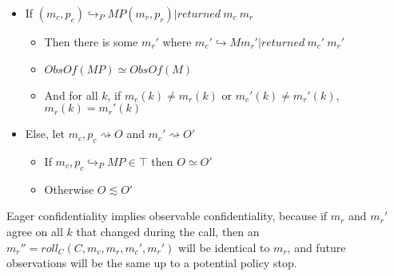 \documentclass{article}
\begin{document}
      \begin{itemize}
        \item If \((m_c,p_c) \hookrightarrow_P MP (m_r,p_r) | \mathit{returned}\ m_c\ m_r\)
          \begin{itemize}
            \item Then there is some \(m_r'\) where
              \(m_c' \hookrightarrow M m_r' | \mathit{returned}\ m_c'\ m_r'\)
            \item \(\mathit{ObsOf}(MP) \simeq \mathit{ObsOf}(M)\)
            \item And for all \(k\), if \(m_c(k) \not = m_r(k)\) or \(m_c'(k) \not = m_r'(k)\),
              \(m_r(k) = m_r'(k)\)
          \end{itemize}
        \item Else, let \(m_c,p_c \rightsquigarrow O\) and \(m_c' \rightsquigarrow O'\)
          \begin{itemize}
            \item If \(m_c,p_c \hookrightarrow_P MP \in \top\) then \(O \simeq O'\)
            \item Otherwise \(O \lesssim O'\)
          \end{itemize}
      \end{itemize}

      Eager confidentiality implies observable confidentiality, because if \(m_r\) and \(m_r'\) agree
      on all \(k\) that changed during the call, then an \(m_r'' = \mathit{roll}_C(C,m_c,m_r,m_c',m_r')\)
      will be identical to \(m_r\), and future observations will be the same up to a potential policy
      stop.
 
\end{document}
